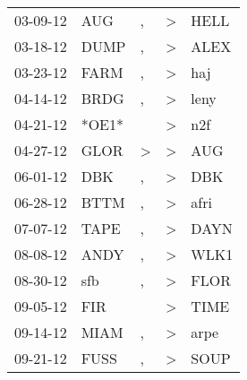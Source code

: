 \begin{supertabular}{p{0.07\textwidth}p{0.06\textwidth}p{0.02\textwidth}p{0.02\textwidth}p{0.06\textwidth}}
          03-09-12\textsuperscript{} &            AUG\textsuperscript{} &                , &     \textgreater &           HELL\textsuperscript{} \\
          03-18-12\textsuperscript{} &           DUMP\textsuperscript{} &                , &     \textgreater &           ALEX\textsuperscript{} \\
          03-23-12\textsuperscript{} &           FARM\textsuperscript{} &                , &     \textgreater &            haj\textsuperscript{} \\
          04-14-12\textsuperscript{} &           BRDG\textsuperscript{} &                , &     \textgreater &           leny\textsuperscript{} \\
          04-21-12\textsuperscript{} &                            *OE1* &                  &     \textgreater &            n2f\textsuperscript{} \\
          04-27-12\textsuperscript{} &           GLOR\textsuperscript{} &     \textgreater &     \textgreater &            AUG\textsuperscript{} \\
          06-01-12\textsuperscript{} &            DBK\textsuperscript{} &                , &     \textgreater &            DBK\textsuperscript{} \\
          06-28-12\textsuperscript{} &           BTTM\textsuperscript{} &                , &     \textgreater &           afri\textsuperscript{} \\
          07-07-12\textsuperscript{} &           TAPE\textsuperscript{} &                , &     \textgreater &           DAYN\textsuperscript{} \\
          08-08-12\textsuperscript{} &           ANDY\textsuperscript{} &                , &     \textgreater &           WLK1\textsuperscript{} \\
          08-30-12\textsuperscript{} &            sfb\textsuperscript{} &                , &     \textgreater &           FLOR\textsuperscript{} \\
          09-05-12\textsuperscript{} &            FIR\textsuperscript{} &                  &     \textgreater &           TIME\textsuperscript{} \\
          09-14-12\textsuperscript{} &           MIAM\textsuperscript{} &                , &     \textgreater &           arpe\textsuperscript{} \\
          09-21-12\textsuperscript{} &           FUSS\textsuperscript{} &                , &     \textgreater &           SOUP\textsuperscript{} \\

\end{supertabular}
